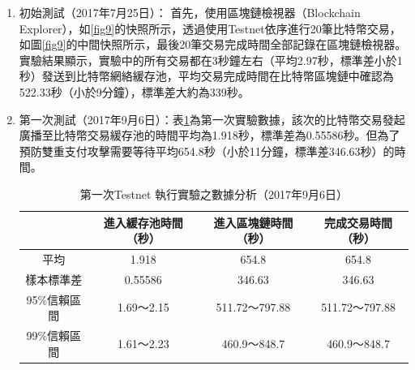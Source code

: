 		\begin{enumerate}
			\item 初始測試（2017年7月25日）：
			首先，使用區塊鏈檢視器（Blockchain Explorer）\supercite{Blockchainexplorer:Ananalyticalprocessandinvestigationenvironmentforbitcoin}，如\ref{fig9}的快照所示，透過使用Testnet依序進行20筆比特幣交易，如圖\ref{fig9}的中間快照所示，最後20筆交易完成時間全部記錄在區塊鏈檢視器。實驗結果顯示，實驗中的所有交易都在3秒鐘左右（平均2.97秒，標準差小於1秒）發送到比特幣網絡緩存池，平均交易完成時間在比特幣區塊鏈中確認為522.33秒（小於9分鐘），標準差大約為339秒。

			\item 第一次測試（2017年9月6日）：表\ref{1general}為第一次實驗數據，該次的比特幣交易發起廣播至比特幣交易緩存池的時間平均為1.918秒，標準差為0.55586秒。但為了預防雙重支付攻擊需要等待平均654.8秒（小於11分鐘，標準差346.63秒）的時間。

				\begin{table}[!htbp]
				\centering
				\caption{第一次Testnet 執行實驗之數據分析（2017年9月6日）}
				\label{1general}
				\begin{tabular}{|c|c|c|c|}
				\hline
				         & 進入緩存池時間（秒） & 進入區塊鏈時間（秒）    & 完成交易時間（秒）     \\ \hline
				平均       & 1.918      & 654.8         & 654.8         \\ \hline
				樣本標準差    & 0.55586    & 346.63        & 346.63        \\ \hline
				95\%信賴區間 & 1.69～2.15  & 511.72～797.88 & 511.72～797.88 \\ \hline
				99\%信賴區間 & 1.61～2.23  & 460.9～848.7   & 460.9～848.7   \\ \hline
				\end{tabular}
				\end{table}


\end{enumerate}
